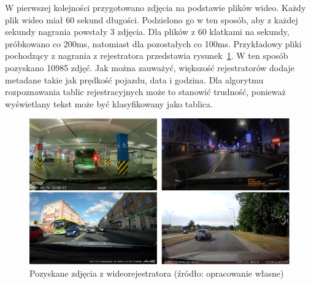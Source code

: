 W pierwszej kolejności przygotowano zdjęcia na podstawie plików wideo.
Każdy plik wideo miał 60 sekund długości.
Podzielono go w ten sposób, aby z każdej sekundy nagrania powstały 3 zdjęcia.
Dla plików z 60 klatkami na sekundy, próbkowano co 200ms, natomiast dla pozostałych co 100ms.
Przykładowy pliki pochodzący z nagrania z rejestratora przedstawia rysunek~\ref{fig:captured_frame}.
W ten sposób pozyskano 10985 zdjęć.
Jak można zauważyć, większość rejestratorów dodaje metadane takie jak prędkość pojazdu, data i godzina.
Dla algorytmu rozpoznawania tablic rejestracyjnych może to stanowić trudność, ponieważ wyświetlany tekst może być klasyfikowany jako tablica.
\begin{figure}[!ht]
    \centering
    \includegraphics[scale=0.4]{Pictures/captured_frames}
    \caption{Pozyskane zdjęcia z wideorejestratora (źródło: opracowanie własne)}
    \label{fig:captured_frame}
\end{figure}
\FloatBarrier

